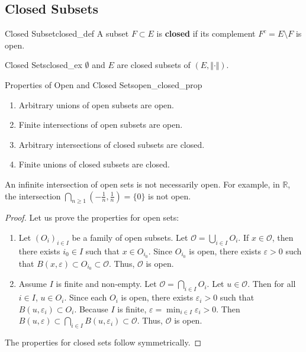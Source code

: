 \documentclass[11pt, a4paper]{article}
\newcommand{\R}{\mathbb{R}}
\newcommand{\eps}{\varepsilon}
\begin{document}
\subsection{Closed Subsets}
\begin{definition}{Closed Subset}{closed_def}
A subset $F \subset E$ is \textbf{closed} if its complement $F^c = E \setminus F$ is open.
\end{definition}

\begin{example}{Closed Sets}{closed_ex}
$\emptyset$ and $E$ are closed subsets of $(E, \Vert \cdot \Vert)$.
\end{example}

\begin{proposition}{Properties of Open and Closed Sets}{open_closed_prop}
\begin{enumerate}
    \item Arbitrary unions of open subsets are open.
    \item Finite intersections of open subsets are open.
    \item Arbitrary intersections of closed subsets are closed.
    \item Finite unions of closed subsets are closed.
\end{enumerate}
\end{proposition}
\begin{remark}{}{}
An infinite intersection of open sets is not necessarily open. For example, in $\R$, the intersection $\bigcap_{n \ge 1} (-\frac{1}{n}, \frac{1}{n}) = \{0\}$ is not open.
\end{remark}
\begin{proof}
Let us prove the properties for open sets:
\begin{enumerate}
    \item Let $(O_i)_{i \in I}$ be a family of open subsets. Let $\mathcal{O} = \bigcup_{i \in I} O_i$. If $x \in \mathcal{O}$, then there exists $i_0 \in I$ such that $x \in O_{i_0}$. Since $O_{i_0}$ is open, there exists $\eps > 0$ such that $B(x, \eps) \subset O_{i_0} \subset \mathcal{O}$. Thus, $\mathcal{O}$ is open.
    \item Assume $I$ is finite and non-empty. Let $\mathcal{O} = \bigcap_{i \in I} O_i$. Let $u \in \mathcal{O}$. Then for all $i \in I$, $u \in O_i$. Since each $O_i$ is open, there exists $\eps_i > 0$ such that $B(u, \eps_i) \subset O_i$. Because $I$ is finite, $\eps = \min_{i \in I} \eps_i > 0$. Then $B(u, \eps) \subset \bigcap_{i \in I} B(u, \eps_i) \subset \mathcal{O}$. Thus, $\mathcal{O}$ is open.
\end{enumerate}
The properties for closed sets follow symmetrically.
\end{proof}
\end{document}
